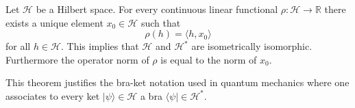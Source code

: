 	\begin{theorem}
    		Let $\mathcal{H}$ be a Hilbert space. For every continuous linear functional $\rho:\mathcal{H}\rightarrow\mathbb{R}$ there exists a unique element $x_0\in\mathcal{H}$ such that
    		\begin{equation}
	    		\rho(h) = \langle h, x_0 \rangle
    		\end{equation}
	    	for all $h\in\mathcal{H}$. This implies that $\mathcal{H}$ and $\mathcal{H}^*$ are isometrically isomorphic. Furthermore the operator norm of $\rho$ is equal to the norm of $x_0$.
	\end{theorem}
	\begin{remark}
    		This theorem justifies the bra-ket notation used in quantum mechanics where one associates to every ket $|\psi\rangle\in\mathcal{H}$ a bra $\langle\psi|\in\mathcal{H}^*$.
	\end{remark}
